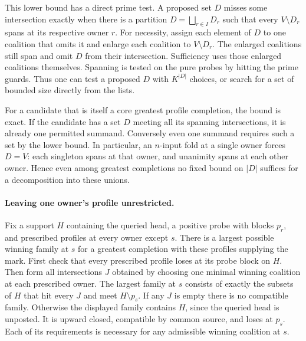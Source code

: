 This lower bound has a direct prime test. A proposed set $D$
misses some intersection exactly when there is a partition
$D=\bigsqcup_{r\in I}D_r$ such that every $V\setminus D_r$
spans at its respective owner $r$. For necessity, assign each
element of $D$ to one coalition that omits it and enlarge
each coalition to $V\setminus D_r$. The enlarged coalitions
still span and omit $D$ from their intersection. Sufficiency
uses those enlarged coalitions themselves. Spanning is tested
on the pure probes by hitting the prime guards. Thus one can
test a proposed $D$ with $K^{|D|}$ choices, or search for
a set of bounded size directly from the lists.

For a candidate that is itself a core greatest profile
completion, the bound is exact. If the candidate has a set
$D$ meeting all its spanning intersections, it is already
one permitted summand. Conversely even one summand requires
such a set by the lower bound. In particular, an $n$-input
fold at a single owner forces $D=V$: each singleton spans at
that owner, and unanimity spans at each other owner. Hence
even among greatest completions no fixed bound on $|D|$
suffices for a decomposition into these unions.

\paragraph{Leaving one owner's profile unrestricted.}
Fix a support $H$ containing the queried head, a positive probe
with blocks $p_r$, and prescribed profiles at every owner except
$s$. There is a largest possible winning family at $s$ for a
greatest completion with these profiles supplying the mark.
First check that every prescribed profile loses at its probe block
on $H$. Then form all intersections $J$ obtained by choosing one
minimal winning coalition at each prescribed owner. The largest
family at $s$ consists of exactly the subsets of $H$ that hit
every $J$ and meet $H\setminus p_s$. If any $J$ is empty there
is no compatible family. Otherwise the displayed family contains
$H$, since the queried head is unposted. It is upward closed,
compatible by common source, and loses at $p_s$. Each of its
requirements is necessary for any admissible winning coalition
at $s$.

